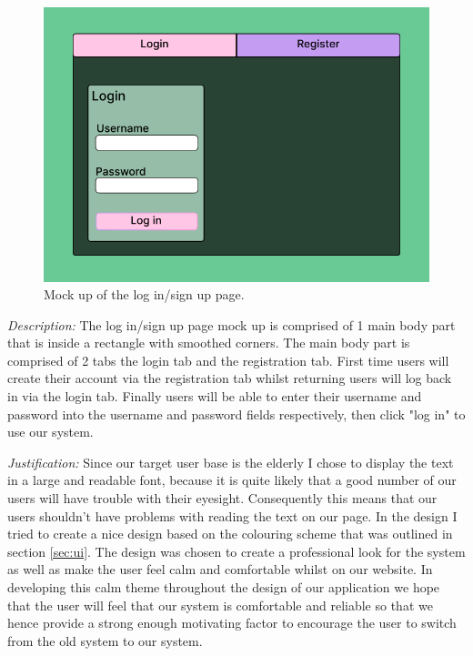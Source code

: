 \begin{figure}[H]
\centering

\includegraphics[scale=0.2]{Images/Login_Page_1.png}

\caption{Mock up of the log in/sign up page.}
\label{fig:login}
\end{figure}

\textit{Description:}
The log in/sign up page mock up is comprised of 1 main
body part that is inside a rectangle with smoothed corners.
The main body part is comprised of 2 tabs the login tab and
the registration tab. First time users will create their 
account via the registration tab whilst returning users will
log back in via the login tab. Finally users will be able to 
enter their username and password into the username and 
password fields respectively, then click "log in" to use our
system.
\\ \vspace{0.2cm}

\textit{Justification:}
Since our target user base is the elderly I chose to display 
the text in a large and readable font, because it is quite 
likely that a good number of our users will have trouble 
with their eyesight. Consequently this means that our 
users shouldn't have problems with reading the text on our 
page. In the design I tried to create a nice design based on 
the colouring scheme that was outlined in section \ref{sec:ui}.
The design was chosen to create a professional look for the 
system as well as make the user feel calm and comfortable 
whilst on our website. In developing this calm theme 
throughout the design of our application we hope that 
the user will feel that our system is comfortable and 
reliable so that we hence provide a strong enough
motivating factor to encourage the user to switch from
the old system to our system.

